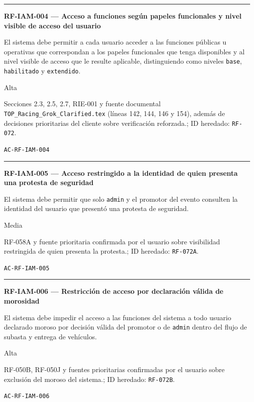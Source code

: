 \documentclass[10pt,letterpaper]{article}
\begin{document}
\vspace{0.25em}\hrule\vspace{0.65em}
\noindent\textbf{RF-IAM-004 --- Acceso a funciones según papeles funcionales y nivel visible de acceso del usuario}\par
\begin{description}[style=nextline,leftmargin=3.15cm,labelwidth=2.8cm,font=\normalfont\bfseries]
\item[Obligación] El sistema debe permitir a cada usuario acceder a las funciones públicas u operativas que correspondan a los papeles funcionales que tenga disponibles y al nivel visible de acceso que le resulte aplicable, distinguiendo como niveles \texttt{base}, \texttt{habilitado} y \texttt{extendido}.
\item[Prioridad] Alta
\item[Procedencia] Secciones 2.3, 2.5, 2.7, RIE-001 y fuente documental \texttt{TOP\_Racing\_Grok\_Clarified.tex} (líneas 142, 144, 146 y 154), además de decisiones prioritarias del cliente sobre verificación reforzada.; ID heredado: \texttt{RF-072}.
\item[Verificación] \texttt{AC-RF-IAM-004}
\end{description}
\vspace{0.25em}\hrule\vspace{0.65em}
\noindent\textbf{RF-IAM-005 --- Acceso restringido a la identidad de quien presenta una protesta de seguridad}\par
\begin{description}[style=nextline,leftmargin=3.15cm,labelwidth=2.8cm,font=\normalfont\bfseries]
\item[Obligación] El sistema debe permitir que solo \texttt{admin} y el promotor del evento consulten la identidad del usuario que presentó una protesta de seguridad.
\item[Prioridad] Media
\item[Procedencia] RF-058A y fuente prioritaria confirmada por el usuario sobre visibilidad restringida de quien presenta la protesta.; ID heredado: \texttt{RF-072A}.
\item[Verificación] \texttt{AC-RF-IAM-005}
\end{description}
\vspace{0.25em}\hrule\vspace{0.65em}
\noindent\textbf{RF-IAM-006 --- Restricción de acceso por declaración válida de morosidad}\par
\begin{description}[style=nextline,leftmargin=3.15cm,labelwidth=2.8cm,font=\normalfont\bfseries]
\item[Obligación] El sistema debe impedir el acceso a las funciones del sistema a todo usuario declarado moroso por decisión válida del promotor o de \texttt{admin} dentro del flujo de subasta y entrega de vehículos.
\item[Prioridad] Alta
\item[Procedencia] RF-050B, RF-050J y fuentes prioritarias confirmadas por el usuario sobre exclusión del moroso del sistema.; ID heredado: \texttt{RF-072B}.
\item[Verificación] \texttt{AC-RF-IAM-006}
\end{description}
\end{document}

